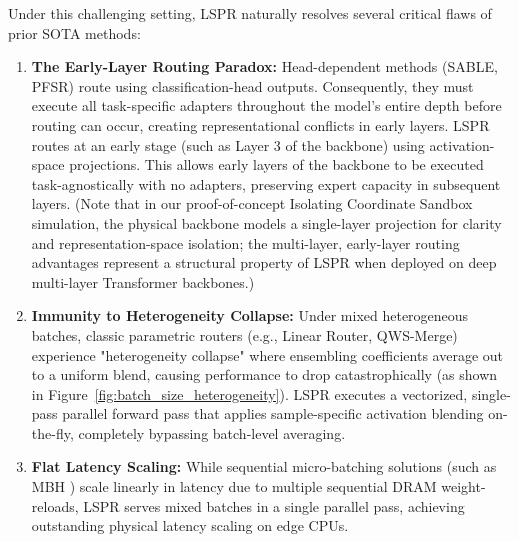Under this challenging setting, LSPR naturally resolves several critical flaws of prior SOTA methods:
\begin{enumerate}
    \item \textbf{The Early-Layer Routing Paradox:} Head-dependent methods (SABLE, PFSR) route using classification-head outputs. Consequently, they must execute all task-specific adapters throughout the model's entire depth before routing can occur, creating representational conflicts in early layers. LSPR routes at an early stage (such as Layer 3 of the backbone) using activation-space projections. This allows early layers of the backbone to be executed task-agnostically with no adapters, preserving expert capacity in subsequent layers. (Note that in our proof-of-concept Isolating Coordinate Sandbox simulation, the physical backbone models a single-layer projection for clarity and representation-space isolation; the multi-layer, early-layer routing advantages represent a structural property of LSPR when deployed on deep multi-layer Transformer backbones.)
    \item \textbf{Immunity to Heterogeneity Collapse:} Under mixed heterogeneous batches, classic parametric routers (e.g., Linear Router, QWS-Merge) experience "heterogeneity collapse" where ensembling coefficients average out to a uniform blend, causing performance to drop catastrophically (as shown in Figure~\ref{fig:batch_size_heterogeneity}). LSPR executes a vectorized, single-pass parallel forward pass that applies sample-specific activation blending on-the-fly, completely bypassing batch-level averaging.
    \item \textbf{Flat Latency Scaling:} While sequential micro-batching solutions (such as MBH \cite{pfsr2025}) scale linearly in latency due to multiple sequential DRAM weight-reloads, LSPR serves mixed batches in a single parallel pass, achieving outstanding physical latency scaling on edge CPUs.
\end{enumerate}

